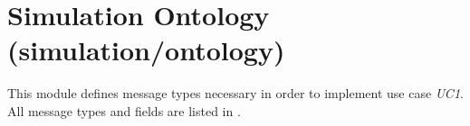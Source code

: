 \section{Simulation Ontology (simulation/ontology)}
This module defines message types necessary in order to implement use case \textit{UC1}. All message types and fields are listed in .